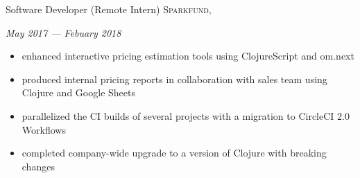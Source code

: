 \documentclass[10pt,a4paper]{article}
\begin{document}
\headedsection
  {Software Developer (Remote Intern)}
  {\textsc{Sparkfund, }}
  {%
      {\textit{May 2017 --- Febuary 2018}}
      {%
      \begin{itemize}
        \item enhanced interactive pricing estimation tools using ClojureScript and om.next
        \item produced internal pricing reports in collaboration with sales team using Clojure and Google Sheets
        \item parallelized the CI builds of several projects with a migration to CircleCI 2.0 Workflows
        \item completed company-wide upgrade to a version of Clojure with breaking changes
      \end{itemize}
      }%
  }

\end{document}
